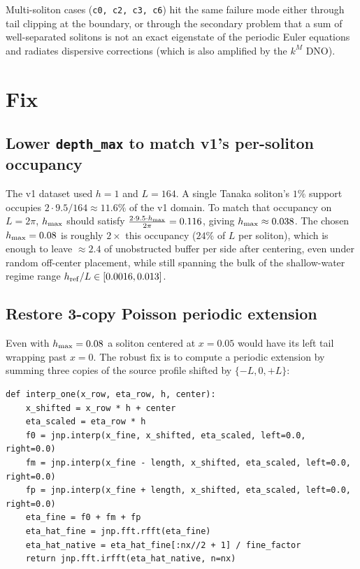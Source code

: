 \documentclass[11pt]{article}
\begin{document}
Multi-soliton cases (\texttt{c0, c2, c3, c6}) hit the same failure mode either
through tail clipping at the boundary, or through the secondary problem that
a sum of well-separated solitons is not an exact eigenstate of the periodic
Euler equations and radiates dispersive corrections (which is also amplified
by the $k^M$ DNO).

\section{Fix}

\subsection{Lower \texttt{depth\_max} to match v1's per-soliton occupancy}

The v1 dataset used $h = 1$ and $L = 164$. A single Tanaka soliton's $1\%$
support occupies $2 \cdot 9.5 / 164 \approx 11.6\%$ of the v1 domain. To match
that occupancy on $L = 2\pi$, $h_{\rm max}$ should satisfy
$\frac{2 \cdot 9.5 \cdot h_{\rm max}}{2\pi} = 0.116$, giving $h_{\rm max}
\approx 0.038$. The chosen $h_{\rm max} = 0.08$ is roughly $2\times$ this
occupancy ($24\%$ of $L$ per soliton), which is enough to leave
$\approx 2.4$ of unobstructed buffer per side after centering, even under
random off-center placement, while still spanning the bulk of the
shallow-water regime range $h_{\rm ref}/L \in [0.0016, 0.013]$.

\subsection{Restore 3-copy Poisson periodic extension}

Even with $h_{\rm max} = 0.08$ a soliton centered at $x = 0.05$ would have its
left tail wrapping past $x = 0$. The robust fix is to compute a periodic
extension by summing three copies of the source profile shifted by $\{-L, 0,
+L\}$:

\begin{lstlisting}
def interp_one(x_row, eta_row, h, center):
    x_shifted = x_row * h + center
    eta_scaled = eta_row * h
    f0 = jnp.interp(x_fine, x_shifted, eta_scaled, left=0.0, right=0.0)
    fm = jnp.interp(x_fine - length, x_shifted, eta_scaled, left=0.0, right=0.0)
    fp = jnp.interp(x_fine + length, x_shifted, eta_scaled, left=0.0, right=0.0)
    eta_fine = f0 + fm + fp
    eta_hat_fine = jnp.fft.rfft(eta_fine)
    eta_hat_native = eta_hat_fine[:nx//2 + 1] / fine_factor
    return jnp.fft.irfft(eta_hat_native, n=nx)
\end{lstlisting}
\end{document}
